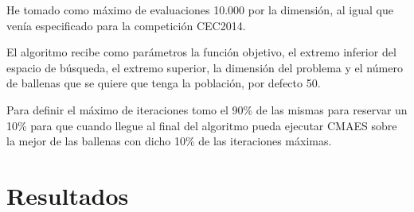 \documentclass[12pt,a4paper]{article}
\begin{document}
	He tomado como máximo de evaluaciones 10.000 por la dimensión, al igual que venía especificado para la competición CEC2014.

	El algoritmo recibe como parámetros la función objetivo, el extremo inferior del espacio de búsqueda, el extremo superior, la dimensión del problema y el número de ballenas que se quiere que tenga la población, por defecto 50.
	
	Para definir el máximo de iteraciones tomo el 90\% de las mismas para reservar un 10\% para que cuando llegue al final del algoritmo pueda ejecutar CMAES sobre la mejor de las ballenas con dicho 10\% de las iteraciones máximas.
	
	\section{Resultados}
	\label{sec:resultados}
	
	
	
	
	\newpage
	
\end{document}
